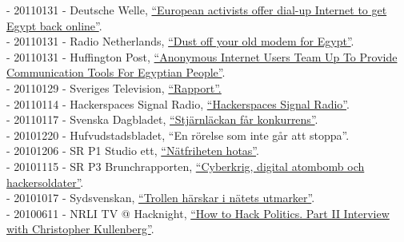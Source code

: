 \documentclass[a4paper,11pt,oneside]{article}
\begin{document}
{    - 20110131 - Deutsche Welle, \href{http://www.dw.com/en/european-activists-offer-dial-up-internet-to-get-egypt-back-online/a-14807049}{``European activists offer dial-up Internet to get Egypt back online''}. \\
    - 20110131 - Radio Netherlands, \href{http://www.rnw.nl/english/article/dust-your-dialup-modem-contact-egypt}{``Dust off your old modem for Egypt''}. \\
    - 20110131 - Huffington Post,  \href{http://www.huffingtonpost.com/2011/01/29/anonymous-internet-egypt_n_815889.html}{``Anonymous Internet Users Team Up To Provide Communication Tools For Egyptian People''}. \\
    - 20110129 - Sveriges Television, \href{http://www.youtube.com/watch?v=HRZ0QKyiFsE&amp;feature=related}{``Rapport''.} \\
    - 20110114 - Hackerspaces Signal Radio, \href{http://signal.hackerspaces.org/archive/2011-01-13-2200-hacktivism-hour.mp3}{``Hackerspaces Signal Radio''}. \\
    - 20110117 - Svenska Dagbladet,  \href{http://www.svd.se/stjarnlackan-far-konkurrens}{``Stjärnläckan får konkurrens''}. \\
    - 20101220 - Hufvudstadsbladet, ``En rörelse som inte går att stoppa''.\\
    - 20101206 - SR P1 Studio ett, \href{http://t.sr.se/1CQkYCj}{``Nätfriheten hotas''}. \\
    - 20101115 - SR P3 Brunchrapporten, \href{http://t.sr.se/RI5PTm}{``Cyberkrig, digital atombomb och hackersoldater''}. \\
    - 20101017 - Sydsvenskan, \href{http://www.sydsvenskan.se/2010-10-17/trollen-harskar-i-natets-utmarker}{``Trollen härskar i nätets utmarker''}. \\
    - 20100611 - NRLI TV @ Hacknight, \href{http://www.youtube.com/watch?v=VhmH6cJZS4k&amp;feature=related}{``How to Hack Politics. Part II Interview with Christopher Kullenberg''}. \\
}
\end{document}
